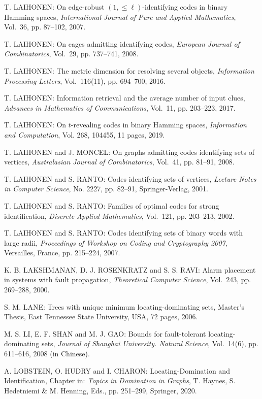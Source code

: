 \begin{thebibliography}{999}
T. LAIHONEN: On edge-robust $(1,\leq\ell)$-identifying codes in binary Hamming spaces, {\it International Journal of Pure and Applied Mathematics}, Vol.~36, pp. 87--102, 2007.

T. LAIHONEN: On cages admitting identifying codes, {\it European Journal of Combinatorics}, Vol.~29, pp. 737--741, 2008. 

T. LAIHONEN: The metric dimension for resolving several objects, {\it Information Processing Letters}, Vol.~116(11), pp. 694--700, 2016.

T. LAIHONEN: Information retrieval and the average number of input clues, {\it Advances in Mathematics of Communications}, Vol.~11, pp. 203--223, 2017.
 
T. LAIHONEN: On $t$-revealing codes in binary Hamming spaces, {\it Information and Computation}, Vol. 268, 104455, 11 pages, 2019.

T. LAIHONEN and J. MONCEL: On graphs admitting codes identifying sets of vertices, {\it Australasian Journal of Combinatorics}, Vol.~41, pp. 81--91, 2008.

T. LAIHONEN and S. RANTO: Codes identifying sets of vertices, {\it Lecture Notes in Computer Science}, No. 2227, pp. 82--91, Springer-Verlag, 2001.

T. LAIHONEN and S. RANTO: Families of optimal codes for strong identification, {\it Discrete Applied Mathematics}, Vol.~121, pp. 203--213, 2002.

T. LAIHONEN and S. RANTO: Codes identifying sets of binary words with large radii, {\it Proceedings of Workshop on Coding and Cryptography 2007}, Versailles, France, pp. 215--224, 2007.

K. B. LAKSHMANAN, D. J. ROSENKRATZ and S. S. RAVI: Alarm placement in systems with fault propagation, {\it Theoretical Computer Science}, Vol.~243, pp. 269--288, 2000.

S. M. LANE: Trees with unique minimum locating-dominating sets, Master's Thesis, East Tennessee State University, USA, 72 pages, 2006.

M. S. LI, E. F. SHAN and M. J. GAO: Bounds for fault-tolerant locating-dominating sets, {\it Journal of Shanghai University. Natural Science}, Vol.~14(6), pp. 611--616, 2008 (in Chinese).

A. LOBSTEIN, O. HUDRY and I. CHARON: Locating-Domination and Identification, Chapter in: {\it Topics in Domination in Graphs}, T. Haynes, S. Hedetniemi \& M. Henning, Eds., pp. 251--299, Springer, 2020.


\end{thebibliography}
